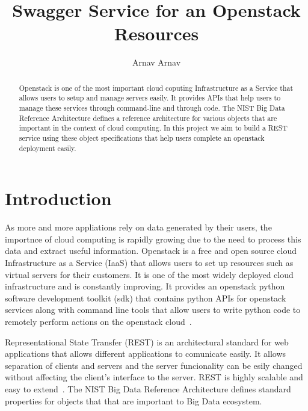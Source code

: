 \title{Swagger Service for an Openstack Resources}


\author{Arnav Arnav}


\renewcommand{\shortauthors}{Arnav}


\begin{abstract}
Openstack is one of the most important cloud coputing Infrastructure
as a Service that allows users to setup and manage servers easily. It
provides APIs that help users to manage these services through
command-line and through code. The NIST Big Data Reference
Architecture defines a reference architecture for various objects that
are important in the context of cloud computing. In this project we
aim to build a REST service using these object specifications that
help users complete an openstack deployment easily.
\end{abstract}



\maketitle

\section{Introduction}
As more and more appliations rely on data generated by their users,
the importnce of cloud computing is rapidly growing due to the need to
process this data and extract useful information.  Openstack is a free
and open source cloud Infrastructure as a Service (IaaS) that allows
users to set up resources such as virtual servers for their
customers. It is one of the most widely deployed cloud infrastructure
and is constantly improving. It provides an openstack python software
development toolkit (sdk) that contains python APIs for openstack
services along with command line tools that allow users to write
python code to remotely perform actions on the openstack
cloud~\cite{hid-sp18-503-openstack-wiki}.

Representational State Transfer (REST) is an architectural standard
for web applications that allows different applications to comunicate
easily. It allows separation of clients and servers and the server
funcionality can be esily changed without affecting the client's
interface to the server. REST is highly scalable and easy to
extend~\cite{hid-sp18-503-REST}. The NIST Big Data Reference
Architecture defines standard properties for objects that that are
important to Big Data ecosystem.

